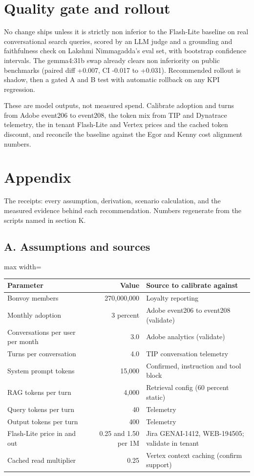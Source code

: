 \documentclass[11pt]{uce-report}
\begin{document}
\section{Quality gate and rollout}
No change ships unless it is strictly non inferior to the Flash-Lite baseline on real conversational search queries, scored by an LLM judge and a grounding and faithfulness check on Lakshmi Nimmagadda's eval set, with bootstrap confidence intervals. The gemma4:31b swap already clears non inferiority on public benchmarks (paired diff +0.007, CI -0.017 to +0.031). Recommended rollout is shadow, then a gated A and B test with automatic rollback on any KPI regression.


\begin{uceinfobox}These are model outputs, not measured spend. Calibrate adoption and turns from Adobe event206 to event208, the token mix from TIP and Dynatrace telemetry, the in tenant Flash-Lite and Vertex prices and the cached token discount, and reconcile the baseline against the Egor and Kenny cost alignment numbers.

\end{uceinfobox}
\section{Appendix}
The receipts: every assumption, derivation, scenario calculation, and the measured evidence behind each recommendation. Numbers regenerate from the scripts named in section K.


\subsection{A. Assumptions and sources}
\vspace{0.4em}
\noindent\begin{adjustbox}{max width=\linewidth}\begin{tabular}{p{4.5cm}rp{6cm}}
\toprule
\textbf{Parameter} & \textbf{Value} & \textbf{Source to calibrate against} \\
\midrule
Bonvoy members & 270,000,000 & Loyalty reporting \\
Monthly adoption & 3 percent & Adobe event206 to event208 (validate) \\
Conversations per user per month & 3.0 & Adobe analytics (validate) \\
Turns per conversation & 4.0 & TIP conversation telemetry \\
System prompt tokens & 15,000 & Confirmed, instruction and tool block \\
RAG tokens per turn & 4,000 & Retrieval config (60 percent static) \\
Query tokens per turn & 40 & Telemetry \\
Output tokens per turn & 400 & Telemetry \\
Flash-Lite price in and out & 0.25 and 1.50 per 1M & Jira GENAI-1412, WEB-194505; validate in tenant \\
Cached read multiplier & 0.25 & Vertex context caching (confirm support) \\
\bottomrule
\end{tabular}\end{adjustbox}
\end{document}

